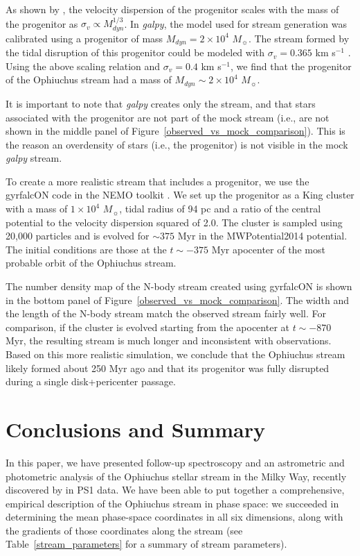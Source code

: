 \documentclass[iop]{emulateapj}
\begin{document}
As shown by \citet{sb13}, the velocity dispersion of the progenitor scales with the 
mass of the progenitor as $\sigma_v \propto M_{dyn}^{1/3}$. In {\em galpy}, the
model used for stream generation was calibrated using a progenitor of mass
$M_{dyn}=2\times10^4$ $M_\sun$. The stream formed by the tidal disruption of this progenitor could be modeled with $\sigma_v=0.365$ km s$^{-1}$ \citep{bov14}. Using
the above scaling relation and $\sigma_v = 0.4$ km s$^{-1}$, we find that the progenitor of the Ophiuchus stream
had a mass of $M_{dyn}\sim2\times10^4$ $M_\sun$.

It is important to note that {\em galpy} creates only the stream, and that stars
associated with the progenitor are not part of the mock stream (i.e., are not
shown in the middle panel of Figure~\ref{observed_vs_mock_comparison}). This is
the reason an overdensity of stars (i.e., the progenitor) is not visible in the
mock {\em galpy} stream.

To create a more realistic stream that includes a progenitor, we use the
gyrfalcON code \citep{deh00,deh02} in the NEMO toolkit \citep{teu95}. We set up
the progenitor as a King cluster \citep{kin66} with a mass of $1\times10^4$
$M_\sun$, tidal radius of 94 pc and a ratio of the central potential to the
velocity dispersion squared of 2.0. The cluster is sampled using 20,000
particles and is evolved for $\sim375$ Myr in the MWPotential2014 potential. The
initial conditions are those at the $t\sim-375$ Myr apocenter of the most
probable orbit of the Ophiuchus stream.

The number density map of the N-body stream created using gyrfalcON is shown in
the bottom panel of Figure~\ref{observed_vs_mock_comparison}. The width and the
length of the N-body stream match the observed stream fairly well. For
comparison, if the cluster is evolved starting from the apocenter at
$t\sim-870$ Myr, the resulting stream is much longer and inconsistent with
observations. Based on this more realistic simulation, we conclude that the
Ophiuchus stream likely formed about 250 Myr ago and that its progenitor was
fully disrupted during a single disk+pericenter passage.

\section{Conclusions and Summary}\label{conclusions}

In this paper, we have presented follow-up spectroscopy and an astrometric and
photometric analysis of the Ophiuchus stellar stream in the Milky Way, recently
discovered by \citet{ber14b} in PS1 data. We have been able to put together a
comprehensive, empirical description of the Ophiuchus stream in phase space: we
succeeded in determining the mean phase-space coordinates in all six dimensions,
along with the gradients of those coordinates along the stream (see
Table~\ref{stream_parameters} for a summary of stream parameters).
\end{document}
